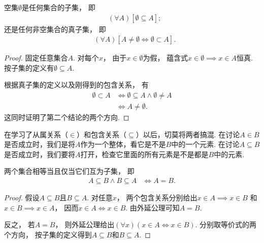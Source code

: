 \begin{theorem}\label{theorem:子集公理.空集是任何集合的子集}
    空集\(\emptyset\)是任何集合的子集，
    即
    \begin{align*}
        &(\forall A)[\emptyset\subseteq A];
    \end{align*}
    还是任何非空集合的真子集，
    即
    \begin{align*}
        &(\forall A)[A\neq\emptyset\iff\emptyset\subset A].
    \end{align*}
    \begin{proof}
        固定任意集合\(A\).
        对每个\(x\)，
        由于\(x\in\emptyset\)为假，
        蕴含式\(x\in\emptyset\implies x\in A\)恒真.
        按子集的定义有\(\emptyset\subseteq A\).

        根据真子集的定义以及刚得到的包含关系，
        有
        \begin{align*}
            \emptyset\subset A
            &\iff \emptyset\subseteq A\land\emptyset\neq A \\
            &\iff A\neq\emptyset.
        \end{align*}
        这同时证明了第二个结论的两个方向.
    \end{proof}
\end{theorem}

在学习了从属关系（\(\in\)）和包含关系（\(\subseteq\)）以后，切莫将两者搞混.
在讨论\(A \in B\)是否成立时，我们是将\(A\)作为一个整体，看它是不是\(B\)中的一个元素.
在讨论\(A \subseteq B\)是否成立时，我们要将\(A\)打开，检查它里面的所有元素是不是都是\(B\)中的元素.

\begin{theorem}
    两个集合相等当且仅当它们互为子集，
    即
    \begin{align*}
        A\subseteq B\land B\subseteq A &\iff A=B.
    \end{align*}
    \begin{proof}
        假设\(A\subseteq B\)且\(B\subseteq A\).
        对任意\(x\)，
        两个包含关系分别给出\(x\in A\implies x\in B\)
        和\(x\in B\implies x\in A\)，
        因而\(x\in A\iff x\in B\).
        由外延公理可知\(A=B\).

        反之，
        若\(A=B\)，
        则外延公理给出\((\forall x)(x\in A\iff x\in B)\).
        分别取等价式的两个方向，
        按子集的定义得到\(A\subseteq B\)和\(B\subseteq A\).
    \end{proof}
\end{theorem}

